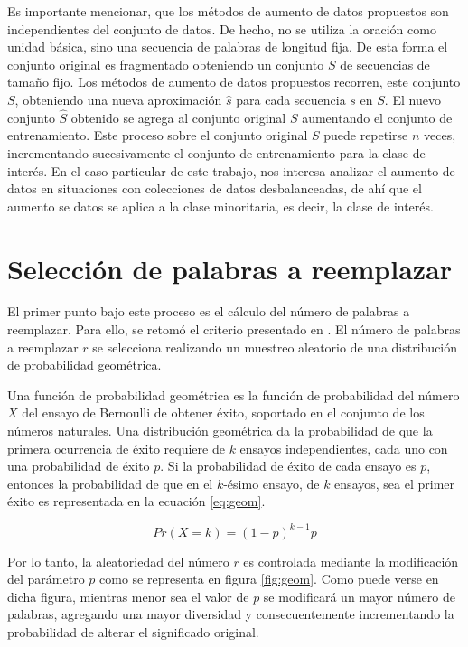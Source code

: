 Es importante mencionar, que los métodos de aumento de datos propuestos son independientes del conjunto de datos. De hecho, no se utiliza la oración como unidad básica, sino una secuencia de palabras de longitud fija. De esta forma el conjunto original es fragmentado obteniendo un conjunto $S$ de secuencias de tamaño fijo. Los métodos de aumento de datos propuestos recorren, este conjunto $S$, obteniendo una nueva aproximación $\hat{s}$ para cada secuencia $s$ en $S$. El nuevo conjunto $\hat{S}$ obtenido se agrega al conjunto original $S$ aumentando el conjunto de entrenamiento. Este proceso sobre el conjunto original $S$ puede repetirse $n$ veces, incrementando sucesivamente el conjunto de entrenamiento para la clase de interés.
En el caso particular de este trabajo, nos interesa analizar el aumento de datos en situaciones con colecciones de datos desbalanceadas, de ahí que el aumento se datos se aplica a la clase minoritaria, es decir, la clase de interés. 

\section{Selección de palabras a reemplazar}

El primer punto bajo este proceso es el cálculo del número de palabras a reemplazar. Para ello, se retomó el criterio presentado en \citep{zhang2015character}. El número de palabras a reemplazar $r$ se selecciona realizando un muestreo aleatorio de una distribución de probabilidad geométrica. 

Una función de probabilidad geométrica es la función de probabilidad del número $X$ del ensayo de Bernoulli de obtener éxito, soportado en el conjunto de los números naturales. Una distribución geométrica da la probabilidad de que la primera ocurrencia de éxito requiere de $k$ ensayos independientes, cada uno con una probabilidad de éxito $p$. Si la probabilidad de éxito de cada ensayo es $p$, entonces la probabilidad de que en el $k$-ésimo ensayo, de $k$ ensayos, sea el primer éxito es representada en la ecuación \ref{eq:geom}.

\begin{equation} \label{eq:geom}
    Pr(X=k)=(1-p)^{k-1}p
\end{equation}

Por lo tanto, la aleatoriedad del número $r$ es controlada mediante la modificación del parámetro $p$ como se representa en figura \ref{fig:geom}. Como puede verse en dicha figura, mientras menor sea el valor de $p$ se modificará un mayor número de palabras, agregando una mayor diversidad y consecuentemente incrementando la probabilidad de alterar el significado original. 


